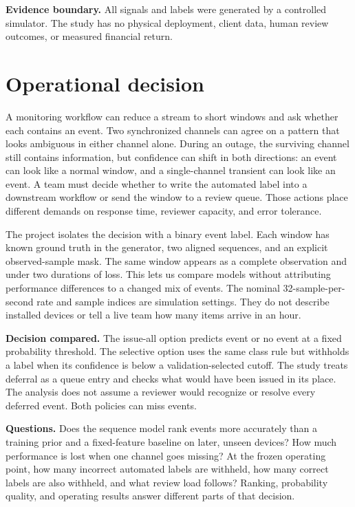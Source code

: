 \documentclass[11pt,letterpaper]{article}
\begin{document}
\vspace{.15in}
\textbf{Evidence boundary.} All signals and labels were generated by a controlled simulator. The study has no physical deployment, client data, human review outcomes, or measured financial return.

\clearpage
\section{Operational decision}\label{sec:decision}

A monitoring workflow can reduce a stream to short windows and ask whether each contains an event. Two synchronized channels can agree on a pattern that looks ambiguous in either channel alone. During an outage, the surviving channel still contains information, but confidence can shift in both directions: an event can look like a normal window, and a single-channel transient can look like an event. A team must decide whether to write the automated label into a downstream workflow or send the window to a review queue. Those actions place different demands on response time, reviewer capacity, and error tolerance.

The project isolates the decision with a binary event label. Each window has known ground truth in the generator, two aligned sequences, and an explicit observed-sample mask. The same window appears as a complete observation and under two durations of loss. This lets us compare models without attributing performance differences to a changed mix of events. The nominal 32-sample-per-second rate and sample indices are simulation settings. They do not describe installed devices or tell a live team how many items arrive in an hour.

\textbf{Decision compared.} The issue-all option predicts event or no event at a fixed probability threshold. The selective option uses the same class rule but withholds a label when its confidence is below a validation-selected cutoff. The study treats deferral as a queue entry and checks what would have been issued in its place. The analysis does not assume a reviewer would recognize or resolve every deferred event. Both policies can miss events.

\textbf{Questions.} Does the sequence model rank events more accurately than a training prior and a fixed-feature baseline on later, unseen devices? How much performance is lost when one channel goes missing? At the frozen operating point, how many incorrect automated labels are withheld, how many correct labels are also withheld, and what review load follows? Ranking, probability quality, and operating results answer different parts of that decision.
\end{document}
